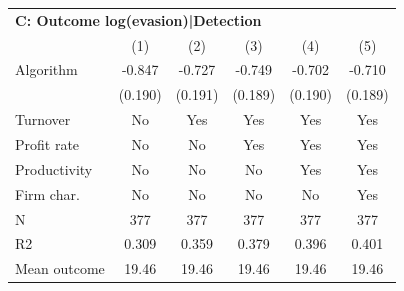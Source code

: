 \begin{tabular}{lccccc}
\midrule \multicolumn{6}{l}{\textbf{C: Outcome log(evasion)|Detection}} \\ \multicolumn{1}{l}{} & (1) & (2) & (3) & (4) & (5) \\ \midrule
Algorithm   &      -0.847\sym{***}&      -0.727\sym{***}&      -0.749\sym{***}&      -0.702\sym{***}&      -0.710\sym{***}\\
            &     (0.190)         &     (0.191)         &     (0.189)         &     (0.190)         &     (0.189)         \\
\midrule
Turnover    &          No         &         Yes         &         Yes         &         Yes         &         Yes         \\
Profit rate &          No         &          No         &         Yes         &         Yes         &         Yes         \\
Productivity&          No         &          No         &          No         &         Yes         &         Yes         \\
Firm char.  &          No         &          No         &          No         &          No         &         Yes         \\
N           &         377         &         377         &         377         &         377         &         377         \\
R2          &       0.309         &       0.359         &       0.379         &       0.396         &       0.401         \\
Mean outcome&       19.46         &       19.46         &       19.46         &       19.46         &       19.46         \\
\bottomrule \end{tabular}
